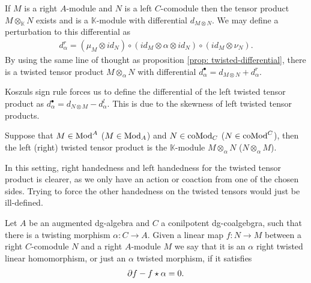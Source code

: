 \documentclass[../thesis.tex]{subfiles}
\begin{document}
            If $M$ is a right $A$-module and $N$ is a left $C$-comodule then the tensor product $M\otimes_\mathbb{K} N$ exists and is a $\mathbb{K}$-module with differential $d_{M\otimes N}$. We may define a perturbation to this differential as 
            \begin{align*}
                d_\alpha^r = (\mu_M\otimes id_N) \circ (id_M \otimes \alpha \otimes id_N) \circ (id_M \otimes \nu_N).
            \end{align*}
            By using the same line of thought as proposition \ref{prop: twisted-differential}, there is a twisted tensor product $M\otimes_\alpha N$ with differential $d_\alpha^\bullet = d_{M\otimes N} + d_\alpha^r$.

            \begin{remark}
                Koszuls sign rule forces us to define the differential of the left twisted tensor product as $d_\alpha^\bullet = d_{N\otimes M} - d_\alpha^l$. This is due to the skewness of left twisted tensor products.
            \end{remark}
            
            \begin{definition}
                Suppose that $M\in \tt{Mod}^A$ ($M\in \tt{Mod}_A$) and $N\in \tt{coMod}_C$ ($N\in \tt{coMod}^C$), then the left (right) twisted tensor product is the $\mathbb{K}$-module $M\otimes_\alpha N$ ($N\otimes_\alpha M$).
            \end{definition}

            In this setting, right handedness and left handedness for the twisted tensor product is clearer, as we only have an action or coaction from one of the chosen sides. Trying to force the other handedness on the twisted tensors would just be ill-defined.

            \begin{definition}
                Let $A$ be an augmented dg-algebra and $C$ a conilpotent dg-coalgebgra, such that there is a twisting morphism $\alpha: C\rightarrow A$. Given a linear map $f: N \rightarrow M$ between a right $C$-comodule $N$ and a right $A$-module $M$ we say that it is an $\alpha$ right twisted linear homomorphism, or just an  $\alpha$ twisted morphism, if it satisfies
                \begin{align*}
                    \partial f - f\star \alpha = 0\tt{.}
                \end{align*} 
            \end{definition}
\end{document}
